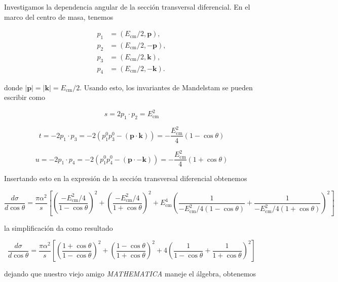 Investigamos la dependencia angular de la sección transversal diferencial. En el marco del centro de masa, tenemos

$$\begin{aligned}
  p_1 &= (E_{\text{cm}}/2, \mathbf{p}), \\
  p_2 &= (E_{\text{cm}}/2, -\mathbf{p}), \\
  p_3 &= (E_{\text{cm}}/2, \mathbf{k}), \\
  p_4 &= (E_{\text{cm}}/2, -\mathbf{k}).
  \end{aligned}$$

  donde $|\mathbf{p}| = |\mathbf{k}| = E_{\text{cm}}/2$. Usando esto, los invariantes de Mandelstam se pueden escribir como

\begin{equation}
s = 2p_1 \cdot p_2 = E_{\text{cm}}^2
\end{equation}

\begin{equation}
t = -2p_1 \cdot p_3 = -2(p_1^0 p_3^0 - (\mathbf{p} \cdot \mathbf{k}))
= -\frac{E_{\text{cm}}^2}{4} (1 - \cos \theta)
\end{equation}

\begin{equation}
u = -2p_1 \cdot p_4 = -2(p_1^0 p_4^0 - (\mathbf{p} \cdot -\mathbf{k}))
= -\frac{E_{\text{cm}}^2}{4} (1 + \cos \theta)
\end{equation}

Insertando esto en la expresión de la sección transversal diferencial obtenemos

\begin{equation}
\frac{d\sigma}{d\cos \theta} = \frac{\pi \alpha^2}{s} \left[ \left( \frac{-E_{\text{cm}}^2/4}{1 - \cos \theta} \right)^2 + \left( \frac{-E_{\text{cm}}^2/4}{1 + \cos \theta} \right)^2
+ E_{\text{cm}}^4 \left( \frac{1}{-E_{\text{cm}}^2/4 (1 - \cos \theta)} + \frac{1}{-E_{\text{cm}}^2/4 (1 + \cos \theta)} \right)^2 \right]
\end{equation}

la simplificación da como resultado

\begin{equation}
\frac{d\sigma}{d\cos \theta} = \frac{\pi \alpha^2}{s} \left[ \left( \frac{1 + \cos \theta}{1 - \cos \theta}\right)^2 + \left( \frac{1 - \cos \theta}{1 + \cos \theta} \right)^2 + 4 \left( \frac{1}{1 - \cos \theta} + \frac{1}{1 + \cos \theta} \right)^2 \right]
\end{equation}

dejando que nuestro viejo amigo \textsl{MATHEMATICA} maneje el álgebra, obtenemos

